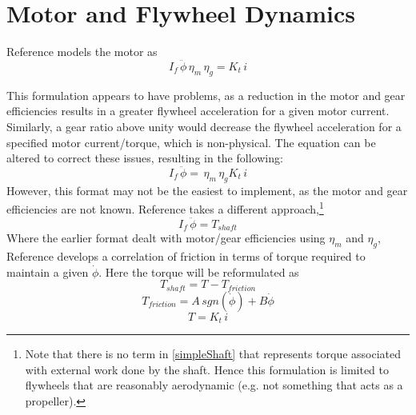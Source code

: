 \documentclass[12pt,letterpaper]{article}
\begin{document}
\section{Motor and Flywheel Dynamics}

Reference \cite{reactionWheel} models the motor as 
%
\begin{equation}
    I_{f} \, \ddot{\phi} \, \eta_{m} \, \eta_{g}  = K_{t} \, i
\end{equation}
%



This formulation appears to have problems, as a reduction in the motor and gear efficiencies results in a 
greater flywheel acceleration for a given motor current.  Similarly, a gear ratio above unity would 
decrease the flywheel acceleration for a specified motor current/torque, which is non-physical.  The equation can be altered
to correct these issues, resulting in the following:
%
\begin{equation}
	I_{f} \, \ddot{\phi} = \, \eta_{m} \, \eta_{g} K_{t} \, i
\end{equation}
%
However, this format may not be the easiest to implement, as the motor and gear efficiencies are not known.  Reference \cite{monograph}
takes a different approach,\footnote{Note that there is no term in \eqref{simpleShaft} that represents torque associated
with external work done by the shaft.  Hence this formulation is limited to flywheels that are reasonably aerodynamic (e.g. not something that
acts as a propeller).}
%
\begin{equation}
    I_{f} \, \ddot{\phi} = T_{shaft}\label{simpleShaft}
\end{equation}
%
Where the earlier format dealt with motor/gear efficiencies using $\eta_{m}$ and $\eta_{g}$, Reference \cite{monograph} develops a correlation of friction in terms of torque required to maintain a given $\dot{\phi}$.  Here the torque will be
reformulated as 
%
\begin{equation}
    T_{shaft} = T - T_{friction}
\end{equation}
%
\begin{equation}
    T_{friction} = A \, sgn(\dot{\phi} ) + B \dot{\phi} 
\end{equation}
%
\begin{equation}
    T = K_{t} \, i
\end{equation}
%
\end{document}
